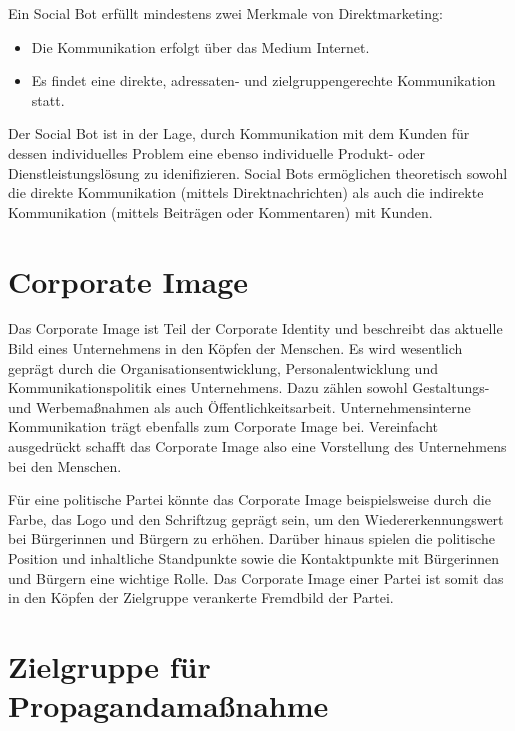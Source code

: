 Ein Social Bot erfüllt mindestens zwei Merkmale von Direktmarketing:

\begin{itemize}
    \item Die Kommunikation erfolgt über das Medium Internet.
    \item Es findet eine direkte, adressaten- und zielgruppengerechte Kommunikation statt.
\end{itemize}

Der Social Bot ist in der Lage, durch Kommunikation mit dem Kunden für dessen individuelles Problem eine ebenso individuelle Produkt- oder Dienstleistungslösung zu idenifizieren. Social Bots ermöglichen theoretisch sowohl die direkte Kommunikation (mittels Direktnachrichten) als auch die indirekte Kommunikation (mittels Beiträgen oder Kommentaren) mit Kunden.

\section{Corporate Image}
\label{sec:04-02_corporate-image}

Das Corporate Image ist Teil der Corporate Identity und beschreibt das aktuelle Bild eines Unternehmens in den Köpfen der Menschen. Es wird wesentlich geprägt durch die Organisationsentwicklung, Personalentwicklung und Kommunikationspolitik eines Unternehmens. Dazu zählen sowohl Gestaltungs- und Werbemaßnahmen als auch Öffentlichkeitsarbeit. Unternehmensinterne Kommunikation trägt ebenfalls zum Corporate Image bei. \cite[S. 13 f.]{002_MKO03_communication-communication-goals-and-advertising-conception} Vereinfacht ausgedrückt schafft das Corporate Image also eine Vorstellung des Unternehmens bei den Menschen.

Für eine politische Partei könnte das Corporate Image beispielsweise durch die Farbe, das Logo und den Schriftzug geprägt sein, um den Wiedererkennungswert bei Bürgerinnen und Bürgern zu erhöhen. Darüber hinaus spielen die politische Position und inhaltliche Standpunkte sowie die Kontaktpunkte mit Bürgerinnen und Bürgern eine wichtige Rolle. Das Corporate Image einer Partei ist somit das in den Köpfen der Zielgruppe verankerte Fremdbild der Partei.

\section{Zielgruppe für Propagandamaßnahme}
\label{sec:04-03_target-group-for-propaganda-measure}

